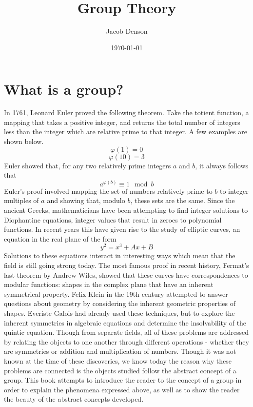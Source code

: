\documentclass[12pt]{report}
\title{Group Theory}
\author{Jacob Denson}
\date{\today}
\begin{document}
\maketitle

\chapter{What is a group?}

In 1761, Leonard Euler proved the following theorem. Take the totient function, a mapping that takes a positive integer, and returns the total number of integers less than the integer which are relative prime to that integer. A few examples are shown below.
%
\[ \varphi(1) = 0 \]
%
\[ \varphi(10) = 3 \]
%
Euler showed that, for any two relatively prime integers $a$ and $b$, it always follows that
%
\[ a^{\varphi(b)} \equiv 1 \mod{b} \]
%
Euler's proof involved mapping the set of numbers relatively prime to $b$ to integer multiples of $a$ and showing that, modulo $b$, these sets are the same. Since the ancient Greeks, mathematicians have been attempting to find integer solutions to Diophantine equations, integer values that result in zeroes to polynomial functions. In recent years this have given rise to the study of elliptic curves, an equation in the real plane of the form
%
\[ y^2 = x^3 + Ax + B \]
%
Solutions to these equations interact in interesting ways which mean that the field is still going strong today. The most famous proof in recent history, Fermat's last theorem by Andrew Wiles, showed that these curves have correspondences to modular functions: shapes in the complex plane that have an inherent symmetrical property. Felix Klein in the 19th century attempted to answer questions about geometry by considering the inherent geometric properties of shapes. Everiste Galois had already used these techniques, but to explore the inherent symmetries in algebraic equations and determine the insolvability of the quintic equation. Though from separate fields, all of these problems are addressed by relating the objects to one another through different operations - whether they are symmetries or addition and multiplication of numbers. Though it was not known at the time of these discoveries, we know today the reason why these problems are connected is the objects studied follow the abstract concept of a group. This book attempts to introduce the reader to the concept of a group in order to explain the phenomena expressed above, as well as to show the reader the beauty of the abstract concepts developed.
\end{document}

